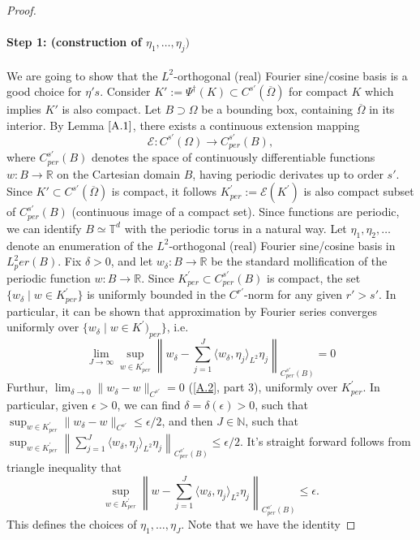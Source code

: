 \documentclass[reqno]{amsart}
\theoremstyle{plain}
\theoremstyle{definition}
\newcommand{\bb}[1]{\mathbb{#1}}
\newcommand{\cal}[1]{\mathcal{#1}}
\begin{document}
\begin{proof}
    \paragraph{\bf Step 1: (construction of $\eta_1, \dots, \eta_j)$} We are going to show that the $L^2$-orthogonal (real) Fourier sine/cosine basis is a good choice for $\eta's$. Consider $K':= \Psi^\dag(K) \subset C^{s'}(\overline{\Omega})$ for compact $K$ which implies $K'$ is also compact. Let $B \supset \Omega$ be a bounding box, containing $\overline{\Omega}$ in its interior. By Lemma $\ref{A.1}$, there exists a continuous extension mapping
    $$ \cal E : C^{s'}(\Omega) \to C^{s'}_{per}(B),$$
    where $C^{s'}_{per}(B)$ denotes the space of continuously differentiable functions $w : B \to \bb R$ on the Cartesian domain $B$, having periodic derivates up to order $s'$. Since $K' \subset C^{s'}(\overline{\Omega})$ is compact, it follows $K^{'}_{per} := \cal E (K^{'})$ is also compact subset of $C^{s'}_{per}(B)$ (continuous image of a compact set). Since functions are periodic, we can identify $B \simeq \bb T^d$ with the periodic torus in a natural way. Let $\eta_1, \eta_2, \dots$ denote an enumeration of the $L^2$-orthogonal (real) Fourier sine/cosine basis in $L^2_per(B)$. Fix $\delta > 0$, and let $w_\delta : B \to \bb R$ be the standard mollification of the periodic function $w : B \to \bb R$. Since $K^{'}_{per} \subset C^{s'}_{per}(B)$ is compact, the set $\{w_\delta \mid w \in K_{per}^{'} \}$ is uniformly bounded in the $C^{r'}$-norm for any given $r' > s'$. In particular, it can be shown that approximation by Fourier series converges uniformly over $\{w_\delta \mid w \in K^{'})_{per}\}$, i.e. 
    $$ \lim\limits_{J \to \infty} \sup\limits_{w \in K^{'}_{per}}\left\| w_\delta - \sum_{j=1}^J \langle w_\delta,\eta_j\rangle_{L^2}\eta_j\right\|_{C^{s'}_{per}(B)} = 0$$
    Furthur, $\lim_{\delta \to 0} \|w_\delta - w\|_{C^{s'}} = 0$ (\ref{A.2}, part 3), uniformly over $K^{'}_{per}$. In particular, given $\epsilon > 0$, we can find $\delta = \delta(\epsilon) > 0$, such that $\sup_{w \in K^{'}_{per}}\|w_\delta - w\|_{C^{s'}} \leq \epsilon/2$, and then $J \in \bb N$, such that $\sup_{w \in K^{'}_{per}} \left\|\sum_{j=1}^J \langle w_\delta,\eta_j\rangle_{L^2}\eta_j\right\|_{C^{s'}_{per}(B)} \leq \epsilon/2$. It's straight forward follows from triangle inequality that
    $$ \sup\limits_{w \in K^{'}_{per}} \left\|w - \sum_{j=1}^J \langle w_\delta,\eta_j\rangle_{L^2}\eta_j\right\|_{C^{s'}_{per}(B)} \leq \epsilon. $$ This defines the choices of $\eta_1, \dots, \eta_J$. Note that we have the identity

\end{proof}
\end{document}
